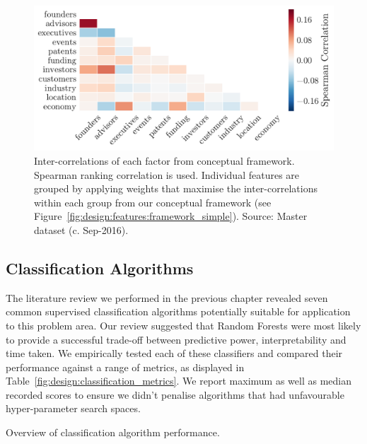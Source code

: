 \documentclass[../thesis/thesis.tex]{subfiles}
\begin{document}
\begin{figure}[!htb]
    \centering
    \includegraphics[width=\textwidth]{../figures/design/distribution_correlations_grouped}
    \caption[Inter-correlations of factors from framework]{Inter-correlations of each factor from conceptual framework. Spearman ranking correlation is used. Individual features are grouped by applying weights that maximise the inter-correlations within each group from our conceptual framework (see Figure~\ref{fig:design:features:framework_simple}). Source: Master dataset (c. Sep-2016).}
    \label{fig:design:grouped_heatmap}
\end{figure}

\subsection{Classification Algorithms}

The literature review we performed in the previous chapter revealed seven common supervised classification algorithms potentially suitable for application to this problem area. Our review suggested that Random Forests were most likely to provide a successful trade-off between predictive power, interpretability and time taken. We empirically tested each of these classifiers and compared their performance against a range of metrics, as displayed in Table~\ref{fig:design:classification_metrics}. We report maximum as well as median recorded scores to ensure we didn't penalise algorithms that had unfavourable hyper-parameter search spaces.

\begin{table}[!htb]
    \centering
    \scalebox{0.8}{}
    \caption[Overview of classification algorithm performance]{Overview of classification algorithm performance.}
    \label{fig:design:classification_metrics}
\end{table}
\end{document}

